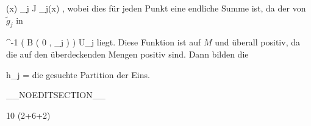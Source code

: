 {\mavergleichskettedisp
{\vergleichskette
{ (x)
}
{ } { \sum_{j \in J} _j(x)
}
{ } {
}
{ } {
}
{ } {
}
}
{}{}{,}
wobei dies für jeden Punkt eine endliche Summe ist, da der
von $\tilde{g}_j$ in

\mavergleichskettedisp
{\vergleichskette
{ \alpha^{-1} \left(  B  \left(  0 , \delta_j  \right)  \right)
}
{ \subset} { U_j
}
{ } {
}
{ } {
}
{ } {
}
}
{}{}{}
liegt. Diese Funktion ist
auf $M$ und überall positiv, da die
 auf den überdeckenden Mengen
 positiv sind. Dann bilden die

\mavergleichskettedisp
{\vergleichskette
{ h_j
}
{ =} { {  }
}
{ } {
}
{ } {
}
{ } {
}
}
{}{}{}
die gesuchte Partition der Eins.

 }

__NOEDITSECTION__

{10 (2+6+2)}

